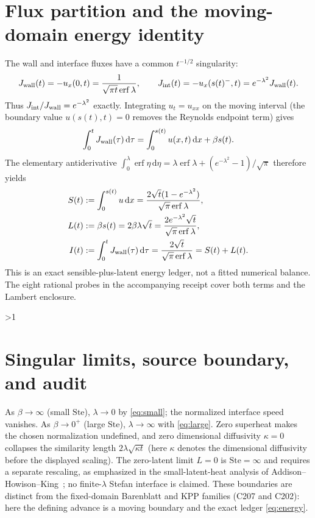 \documentclass[10pt]{article}
\newcommand{\dd}{\,\mathrm d}
\newcommand{\Ste}{\mathrm{Ste}}
\begin{document}
\section{Flux partition and the moving-domain energy identity}
The wall and interface fluxes have a common $t^{-1/2}$ singularity:
\begin{equation}
 J_{\rm wall}(t)=-u_x(0,t)=\frac{1}{\sqrt{\pi t}\operatorname{erf}\lambda},
 \qquad
 J_{\rm int}(t)=-u_x(s(t)^-,t)=e^{-\lambda^2}J_{\rm wall}(t).
 \label{eq:flux}
\end{equation}
Thus $J_{\rm int}/J_{\rm wall}=e^{-\lambda^2}$ exactly. Integrating
$u_t=u_{xx}$ on the moving interval (the boundary value $u(s(t),t)=0$
removes the Reynolds endpoint term) gives
\begin{equation}
 \int_0^tJ_{\rm wall}(\tau)\dd\tau
 =\int_0^{s(t)}u(x,t)\dd x+\beta s(t).
 \label{eq:ledger}
\end{equation}
The elementary antiderivative
$\int_0^\lambda\operatorname{erf}\eta\dd\eta
=\lambda\operatorname{erf}\lambda+(e^{-\lambda^2}-1)/\sqrt\pi$
therefore yields
\begin{align}
 S(t)&:=\int_0^{s(t)}u\dd x
 =\frac{2\sqrt t(1-e^{-\lambda^2})}{\sqrt\pi\operatorname{erf}\lambda},\\
 L(t)&:=\beta s(t)=2\beta\lambda\sqrt t
 =\frac{2e^{-\lambda^2}\sqrt t}{\sqrt\pi\operatorname{erf}\lambda},\\
 I(t)&:=\int_0^tJ_{\rm wall}(\tau)\dd\tau
 =\frac{2\sqrt t}{\sqrt\pi\operatorname{erf}\lambda}=S(t)+L(t).
 \label{eq:energy}
\end{align}
This is an exact sensible-plus-latent energy ledger, not a fitted numerical
balance. The eight rational probes in the accompanying receipt cover both
terms and the Lambert enclosure.
\fi

\ifnum\CRevisionRound>1
\section{Singular limits, source boundary, and audit}
As $\beta\to\infty$ (small $\Ste$), $\lambda\to0$ by \eqref{eq:small}; the
normalized interface speed vanishes. As $\beta\to0^+$ (large $\Ste$),
$\lambda\to\infty$ with \eqref{eq:large}. Zero superheat makes the chosen
normalization undefined, and zero dimensional diffusivity $\kappa=0$ collapses
the similarity length $2\lambda\sqrt{\kappa t}$ (here $\kappa$ denotes the
dimensional diffusivity before the displayed scaling). The zero-latent limit
$L=0$ is $\Ste=\infty$ and requires a separate rescaling, as emphasized in the
small-latent-heat analysis of Addison--Howison--King~\cite{addison}; no finite-$\lambda$ Stefan
interface is claimed.
These boundaries are distinct from the fixed-domain Barenblatt and KPP
families (C207 and C202): here the defining advance is a moving boundary and
the exact ledger \eqref{eq:energy}.
\end{document}
